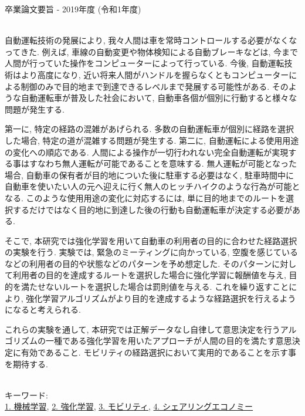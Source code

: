 卒業論文要旨 - 2019年度 (令和1年度)
\begin{center}
\begin{large}
\end{large}
\end{center}

~ \\

自動運転技術の発展により, 我々人間は車を常時コントロールする必要がなくなってきた.
例えば, 車線の自動変更や物体検知による自動ブレーキなどは, 今まで人間が行っていた操作をコンピューターによって行っている.
今後, 自動運転技術はより高度になり, 近い将来人間がハンドルを握らなくともコンピューターによる制御のみで目的地まで到達できるレベルまで発展する可能性がある.
そのような自動運転車が普及した社会において, 自動車各個が個別に行動すると様々な問題が発生する.

第一に, 特定の経路の混雑があげられる.
多数の自動運転車が個別に経路を選択した場合, 特定の道が混雑する問題が発生する.
第二に, 自動運転による使用用途の変化への順応である. 人間による操作が一切行われない完全自動運転が実現する事はすなわち無人運転が可能であることを意味する.
無人運転が可能となった場合, 自動車の保有者が目的地についた後に駐車する必要はなく, 駐車時間中に自動車を使いたい人の元へ迎えに行く無人のヒッチハイクのような行為が可能となる.
このような使用用途の変化に対応するには, 単に目的地までのルートを選択するだけではなく目的地に到達した後の行動も自動運転車が決定する必要がある.

そこで, 本研究では強化学習を用いて自動車の利用者の目的に合わせた経路選択の実験を行う.
実験では, 緊急のミーティングに向かっている, 空腹を感じているなどの利用者の目的や状態などのパターンを予め想定した. そのパターンに対して利用者の目的を達成するルートを選択した場合に強化学習に報酬値を与え, 目的を満たせないルートを選択した場合は罰則値を与える.
これを繰り返すことにより, 強化学習アルゴリズムがより目的を達成するような経路選択を行えるようになると考えられる.

これらの実験を通して, 本研究では正解データなし自律して意思決定を行うアルゴリズムの一種である強化学習を用いたアプローチが人間の目的を満たす意思決定に有効であること. モビリティの経路選択において実用的であることを示す事を期待する.

~ \\
キーワード:\\
\underline{1. 機械学習},
\underline{2. 強化学習},
\underline{3. モビリティ},
\underline{4. シェアリングエコノミー}
\begin{flushright}
\dept \\
\author
\end{flushright}
